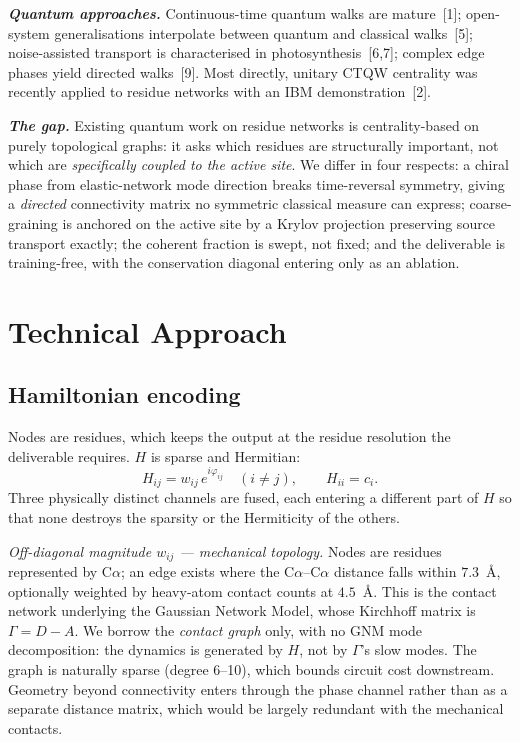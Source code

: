 \documentclass[10pt,a4paper]{article}
\newcommand{\lead}[1]{\textbf{\textit{#1}}}
\begin{document}
\lead{Quantum approaches.} Continuous-time quantum walks are mature~[1]; open-system
generalisations interpolate between quantum and classical walks~[5]; noise-assisted
transport is characterised in photosynthesis~[6,7]; complex edge phases
yield directed walks~[9]. Most directly, unitary CTQW centrality was recently applied to
residue networks with an IBM demonstration~[2].

\lead{The gap.} Existing quantum work on residue networks is centrality-based on purely topological
graphs: it asks which residues are structurally important, not which are \emph{specifically coupled to
the active site}. We differ in four respects: a chiral phase from elastic-network mode direction
breaks time-reversal symmetry, giving a \emph{directed} connectivity matrix no symmetric classical
measure can express; coarse-graining is anchored on the active site by a Krylov projection preserving
source transport exactly; the coherent fraction is swept, not fixed; and the deliverable is
training-free, with the conservation diagonal entering only as an ablation.

\section{Technical Approach}

\subsection{Hamiltonian encoding}

Nodes are residues, which keeps the output at the residue resolution the deliverable requires. $H$
is sparse and Hermitian:
\begin{equation}
H_{ij} = w_{ij}\,e^{i\varphi_{ij}} \quad (i \neq j), \qquad H_{ii} = c_i .
\end{equation}
Three physically distinct channels are fused, each entering a different part of $H$ so that none
destroys the sparsity or the Hermiticity of the others.

\emph{Off-diagonal magnitude $w_{ij}$ --- mechanical topology.} Nodes are residues represented by
C$\alpha$; an edge exists where the C$\alpha$--C$\alpha$ distance falls within $7.3$~\AA, optionally
weighted by heavy-atom contact counts at $4.5$~\AA. This is the contact network underlying the
Gaussian Network Model, whose Kirchhoff matrix is $\Gamma = D - A$. We borrow the \emph{contact
graph} only, with no GNM mode decomposition: the dynamics is
generated by $H$, not by $\Gamma$'s slow modes. The graph is naturally sparse (degree 6--10), which
bounds circuit cost downstream. Geometry beyond connectivity enters through the phase channel rather
than as a separate distance matrix, which would be largely redundant with the mechanical contacts.
\end{document}
